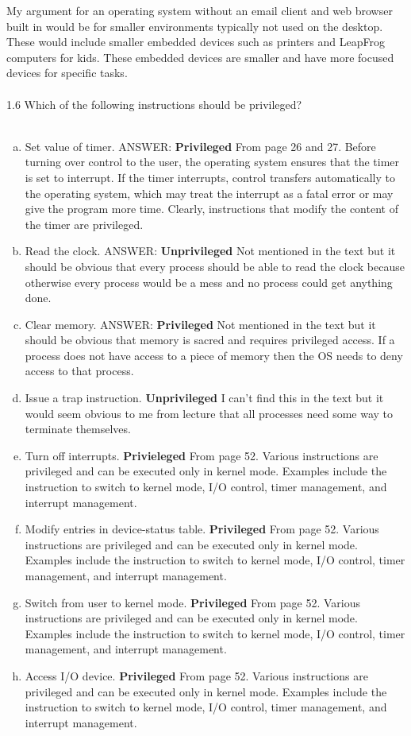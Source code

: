 \documentclass[12pt]{article}
\begin{document}
My argument for an operating system without an email client 
and web browser built in would be for smaller environments 
typically not used on the desktop. These would include smaller 
embedded devices such as printers and LeapFrog computers for kids. 
These embedded devices are smaller and have more focused devices 
for specific tasks.\\\\
1.6 Which of the following instructions should be privileged?\\\\
\begin{enumerate}[a)]
    \item Set value of timer. ANSWER: \textbf{Privileged} From page 26 and 27. 
    Before turning over control to the user, the operating system ensures 
    that the timer is set to interrupt. If the timer interrupts, control 
    transfers automatically to the operating system, which may treat the 
    interrupt as a fatal error or may give the program more time. 
    Clearly, instructions that modify the content of the timer are 
    privileged.
    \item Read the clock. ANSWER: \textbf{Unprivileged} Not mentioned in the
    text but it should be obvious that every process should be able to read 
    the clock because otherwise every process would be a mess and no process 
    could get anything done. 
    \item Clear memory. ANSWER: \textbf{Privileged} Not mentioned in the 
    text but it should be obvious that memory is sacred and requires 
    privileged access. If a process does not have access to a piece of 
    memory then the OS needs to deny access to that process.
    \item Issue a trap instruction. \textbf{Unprivileged} I can't find 
    this in the text but it would seem obvious to me from lecture that 
    all processes need some way to terminate themselves.
    \item Turn off interrupts. \textbf{Privieleged} From 
    page 52. Various instructions are privileged and can be executed only 
    in kernel mode. Examples include the instruction to switch to kernel 
    mode, I/O control, timer management, and interrupt management.
    \item Modify entries in device-status table. \textbf{Privileged} From 
    page 52. Various instructions are privileged and can be executed only 
    in kernel mode. Examples include the instruction to switch to kernel 
    mode, I/O control, timer management, and interrupt management.
    \item Switch from user to kernel mode. \textbf{Privileged} From page 52.
    Various instructions are privileged and can be executed only in kernel
    mode. Examples include the instruction to switch to kernel mode, I/O
    control, timer management, and interrupt management. 
    \item Access I/O device. \textbf{Privileged} From page 52. Various 
    instructions are privileged and can be executed only in kernel mode. 
    Examples include the instruction to switch to kernel mode, I/O
    control, timer management, and interrupt management.
\end{enumerate}
\end{document}
